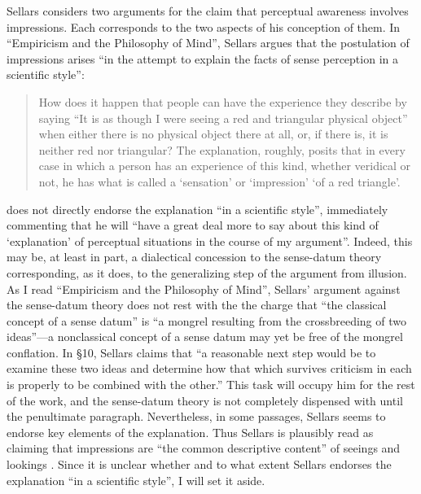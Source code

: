 \documentclass[12pt]{article}
\begin{document}
Sellars considers two arguments for the claim that perceptual awareness involves impressions. Each corresponds to the two aspects of his conception of them. In ``Empiricism and the Philosophy of Mind'', Sellars argues that the postulation of impressions arises ``in the attempt to explain the facts of sense perception in a scientific style'':
\begin{quote}
    How does it happen that people can have the experience they describe by saying ``It is as though I were seeing a red and triangular physical object'' when either there is no physical object there at all, or, if there is, it is neither red nor triangular? The explanation, roughly, posits that in every case in which a person has an experience of this kind, whether veridical or not, he has what is called a `sensation' or `impression' `of a red triangle'.  \citep[§7]{Sellars:1956xp}
\end{quote}
\cite[§7]{Sellars:1956xp} does not directly endorse the explanation ``in a scientific style'', immediately commenting that he will ``have a great deal more to say about this kind of `explanation' of perceptual situations in the course of my argument''. Indeed, this may be, at least in part, a dialectical concession to the sense-datum theory corresponding, as it does, to the generalizing step of the argument from illusion. As I read ``Empiricism and the Philosophy of Mind'', Sellars' \citeyearpar[§7]{Sellars:1956xp} argument against the sense-datum theory does not rest with the the charge that ``the classical concept of a sense datum'' is ``a mongrel resulting from the crossbreeding of two ideas''---a nonclassical concept of a sense datum may yet be free of the mongrel conflation. In §10, Sellars claims that ``a reasonable next step would be to examine these two ideas and determine how that which survives criticism in each is properly to be combined with the other.'' This task will occupy him for the rest of the work, and the sense-datum theory is not completely dispensed with until the penultimate paragraph. Nevertheless, in some passages, Sellars seems to endorse key elements of the explanation. Thus Sellars is plausibly read as claiming that impressions are ``the common descriptive content'' of seeings and lookings \citep[see][167]{Williams:2008fk}. Since it is unclear whether and to what extent Sellars endorses the explanation ``in a scientific style'', I will set it aside.
\end{document}
